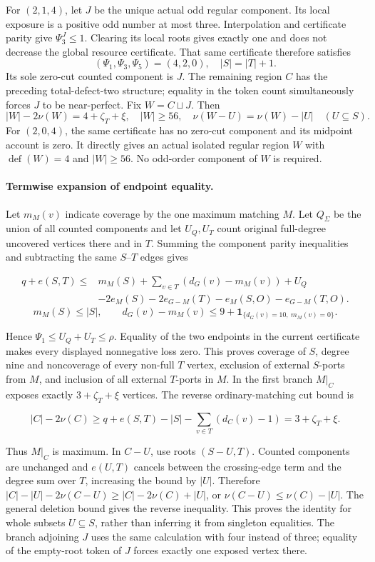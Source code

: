 \documentclass[11pt,a4paper]{article}
\theoremstyle{definition}
\begin{document}
For $(2,1,4)$, let $J$ be the unique actual odd regular component. Its local exposure is a positive odd number at most three. Interpolation and certificate parity give $\Psi_3^J\le1$. Clearing its local roots gives exactly one and does not decrease the global resource certificate. That same certificate therefore satisfies
\[
 (\Psi_1,\Psi_3,\Psi_5)=(4,2,0),\quad |S|=|T|+1.
\]
Its sole zero-cut counted component is $J$. The remaining region $C$ has the preceding total-defect-two structure; equality in the token count simultaneously forces $J$ to be near-perfect. Fix $W=C\sqcup J$. Then
\[
 |W|-2\nu(W)=4+\zeta_T+\xi,\quad |W|\ge56,
 \quad\nu(W-U)=\nu(W)-|U|\quad(U\subseteq S).
\]
For $(2,0,4)$, the same certificate has no zero-cut component and its midpoint account is zero. It directly gives an actual isolated regular region $W$ with $\operatorname{def}(W)=4$ and $|W|\ge56$. No odd-order component of $W$ is required.
\paragraph{Termwise expansion of endpoint equality.}
Let $m_M(v)$ indicate coverage by the one maximum matching $M$. Let $Q_\Sigma$ be the union of all counted components and let $U_Q,U_T$ count original full-degree uncovered vertices there and in $T$. Summing the component parity inequalities and subtracting the same $S$--$T$ edges gives

\begin{align*}
 q+e(S,T)\le{}&m_M(S)+\sum_{v\in T}(d_G(v)-m_M(v))+U_Q\\
 &-2e_M(S)-2e_{G-M}(T)-e_M(S,O)-e_{G-M}(T,O).
\end{align*}
\[
 m_M(S)\le |S|,\qquad
 d_G(v)-m_M(v)\le9+\mathbf1_{\{d_G(v)=10,\ m_M(v)=0\}}.
\]

Hence $\Psi_1\le U_Q+U_T\le\rho$. Equality of the two endpoints in the current certificate makes every displayed nonnegative loss zero. This proves coverage of $S$, degree nine and noncoverage of every non-full $T$ vertex, exclusion of external $S$-ports from $M$, and inclusion of all external $T$-ports in $M$. In the first branch $M|_C$ exposes exactly $3+\zeta_T+\xi$ vertices. The reverse ordinary-matching cut bound is

\[
 |C|-2\nu(C)\ge q+e(S,T)-|S|-\sum_{v\in T}(d_C(v)-1)
 =3+\zeta_T+\xi.
\]

Thus $M|_C$ is maximum. In $C-U$, use roots $(S-U,T)$. Counted components are unchanged and $e(U,T)$ cancels between the crossing-edge term and the degree sum over $T$, increasing the bound by $|U|$. Therefore
$|C|-|U|-2\nu(C-U)\ge |C|-2\nu(C)+|U|$, or $\nu(C-U)\le\nu(C)-|U|$. The general deletion bound gives the reverse inequality. This proves the identity for whole subsets $U\subseteq S$, rather than inferring it from singleton equalities. The branch adjoining $J$ uses the same calculation with four instead of three; equality of the empty-root token of $J$ forces exactly one exposed vertex there.
\end{document}
